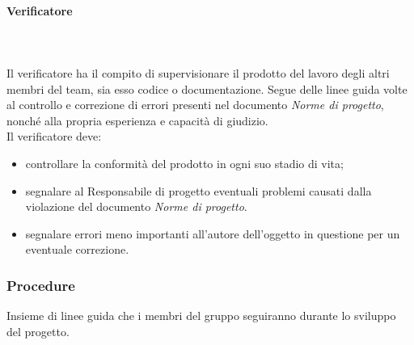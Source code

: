 			\paragraph{Verificatore} \mbox{}\\ \mbox{}\\
			Il verificatore ha il compito di supervisionare il prodotto del lavoro degli altri membri del team, sia esso codice o documentazione. Segue delle linee guida volte al controllo e correzione di errori presenti nel documento \textit{Norme di progetto}, nonché alla propria esperienza e capacità di giudizio.\\
			Il verificatore deve:
			\begin{itemize}
				\item controllare la conformità del prodotto in ogni suo stadio di vita;
				\item segnalare al Responsabile di progetto eventuali problemi causati dalla violazione del documento \textit{Norme di progetto}.
				\item segnalare errori meno importanti all'autore dell'oggetto in questione per un eventuale correzione.
			\end{itemize}
		\subsubsection{Procedure}
		Insieme di linee guida che i membri del gruppo seguiranno durante lo sviluppo del progetto.
